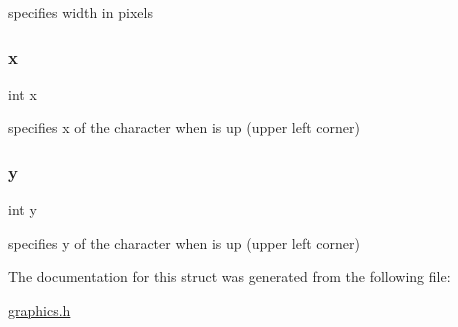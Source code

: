 specifies width in pixels 

\mbox{\label{struct_character_a6150e0515f7202e2fb518f7206ed97dc}} 
\subsubsection{\texorpdfstring{x}{x}}
{\footnotesize\ttfamily int x}



specifies x of the character when is up (upper left corner) 

\mbox{\label{struct_character_a0a2f84ed7838f07779ae24c5a9086d33}} 
\subsubsection{\texorpdfstring{y}{y}}
{\footnotesize\ttfamily int y}



specifies y of the character when is up (upper left corner) 



The documentation for this struct was generated from the following file\+:\begin{DoxyCompactItemize}
\item 
\hyperlink{graphics_8h}{graphics.\+h}\end{DoxyCompactItemize}
